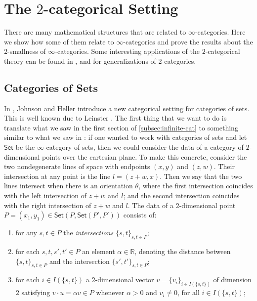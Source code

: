 \documentclass[a4paper,reqno,oneside]{article}
\begin{document}
\section{The $2$-categorical Setting}

There are many mathematical structures that are related to $\infty$-categories.  Here we show how some of them relate to $\infty$-categories and prove the results about the $2$-smallness of $\infty$-categories.  Some interesting applications of the $2$-categorical theory can be found in \cite{johnson2009}, and \cite{JohnsonHellerNicolas2} for generalizations of $2$-categories.


\subsection{Categories of Sets}\label{subsec:Sets}

In \cite{johnson2009}, Johnson and Heller introduce a new categorical setting for categories of sets.  This is well known due to Leinster \cite{leinster2006thesis}.  The first thing that we want to do is translate what we saw in the first section of \ref{subsec:infinite-cat} to something similar to what we saw in \cite{johnson2009}: if one wanted to work with categories of sets and let $\mathsf{Set}$ be the $\infty$-category of sets, then we could consider the data of a category of $2$-dimensional points over the cartesian plane.  To make this concrete, consider the two nondegenerate lines of space with endpoints $(x,y)$ and $(z,w)$.  Their intersection at any point is the line $l = (z+w,x)$.  Then we say that the two lines intersect when there is an orientation $\theta$, where the first intersection coincides with the left intersection of $z+w$ and $l$; and the second intersection coincides with the right intersection of $z+w$ and $l$.  The data of a $2$-dimensional point $P=\left({x_1},{y_1}\right) \in \mathsf{Set}(P,\mathsf{Set}(P',P'))$ consists of: 


\begin{enumerate}[label={(\roman*):(\arabic*)}]
\item for any $s,t \in P$ the \emph{intersections $\{s,t\}_{s,t\in P}$};
\item for each $s,t,s',t'\in P$ an element $\alpha \in \mathbb{R}$, denoting the distance between $\{s,t\}_{s,t\in P}$ and the intersection $\{s',t'\}_{s,t\in P}$;
\item for each $i \in I(\{s,t\})$ a $2$-dimensional vector $v = \{v_i\}_{i\in I(\{s,t\})}$ of dimension $2$ satisfying $v\cdot u = \alpha v\in P$ whenever $\alpha > 0$ and $v_i\neq 0$, for all $i\in I(\{s,t\})$;
\end{enumerate}
\end{document}
